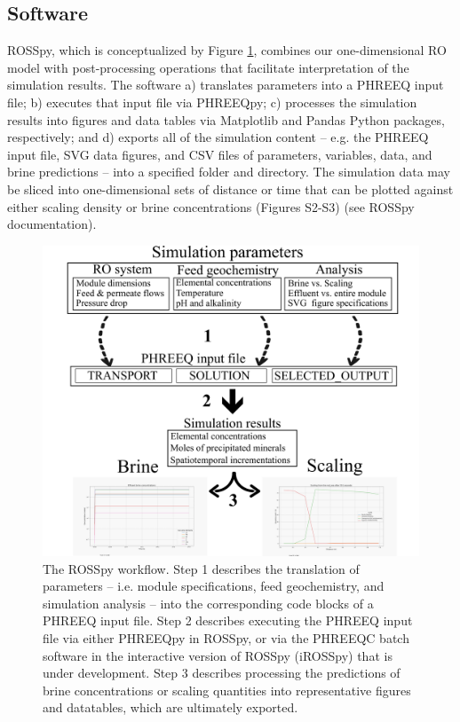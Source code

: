 \subsection{Software}
ROSSpy, which is conceptualized by Figure \ref{workflow}, combines our one-dimensional RO model with post-processing operations that facilitate interpretation of the simulation results. The software a) translates parameters into a PHREEQ input file; b) executes that input file via PHREEQpy; c) processes the simulation results into figures and data tables via Matplotlib \cite{Hunter2007Matplotlib:Environment} and Pandas \cite{McKinney2011Pandas:Statistics} Python packages, respectively; and d) exports all of the simulation content -- e.g. the PHREEQ input file, SVG data figures, and CSV files of parameters, variables, data, and brine predictions -- into a specified folder and directory. The simulation data may be sliced into one-dimensional sets of distance or time that can be plotted against either scaling density or brine concentrations (Figures S2-S3) (see ROSSpy documentation).


\begin{figure}
    \centering
    \includegraphics[width = \linewidth]{images/ROSSpy/rosspy_workflow_1.PNG}
    \caption{
        The ROSSpy workflow. Step 1 describes the translation of parameters -- i.e. module specifications, feed geochemistry, and simulation analysis -- into the corresponding code blocks of a PHREEQ input file. Step 2 describes executing the PHREEQ input file via either PHREEQpy in ROSSpy, or via the PHREEQC batch software in the interactive version of ROSSpy (iROSSpy) that is under development. Step 3 describes processing the predictions of brine concentrations or scaling quantities into representative figures and datatables, which are ultimately exported.
    }
    \label{workflow}
\end{figure}

